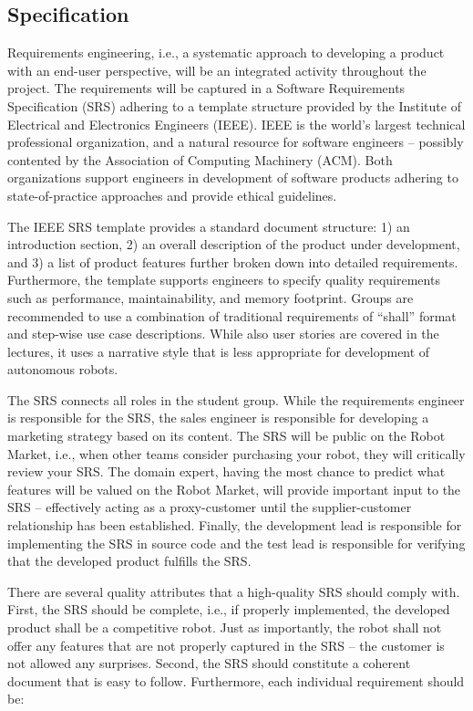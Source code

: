 \documentclass{scrreprt}
\begin{document}
\subsection{Specification}
Requirements engineering, i.e., a systematic approach to developing a product with an end-user perspective, will be an integrated activity throughout the project. The requirements will be captured in a Software Requirements Specification (SRS) adhering to a template structure provided by the Institute of Electrical and Electronics Engineers (IEEE). IEEE is the world's largest technical professional organization, and a natural resource for software engineers -- possibly contented by the Association of Computing Machinery (ACM). Both organizations support engineers in development of software products adhering to state-of-practice approaches and provide ethical guidelines.

The IEEE SRS template provides a standard document structure: 1) an introduction section, 2) an overall description of the product under development, and 3) a list of product features further broken down into detailed requirements. Furthermore, the template supports engineers to specify quality requirements such as performance, maintainability, and memory footprint. Groups are recommended to use a combination of traditional requirements of ``shall'' format and step-wise use case descriptions. While also user stories are covered in the lectures, it uses a narrative style that is less appropriate for development of autonomous robots.

The SRS connects all roles in the student group. While the requirements engineer is responsible for the SRS, the sales engineer is responsible for developing a marketing strategy based on its content. The SRS will be public on the Robot Market, i.e., when other teams consider purchasing your robot, they will critically review your SRS. The domain expert, having the most chance to predict what features will be valued on the Robot Market, will provide important input to the SRS -- effectively acting as a proxy-customer until the supplier-customer relationship has been established. Finally, the development lead is responsible for implementing the SRS in source code and the test lead is responsible for verifying that the developed product fulfills the SRS.

There are several quality attributes that a high-quality SRS should comply with. First, the SRS should be complete, i.e., if properly implemented, the developed product shall be a competitive robot. Just as importantly, the robot shall not offer any features that are not properly captured in the SRS -- the customer is not allowed any surprises. Second, the SRS should constitute a coherent document that is easy to follow. Furthermore, each individual requirement should be:
\end{document}
